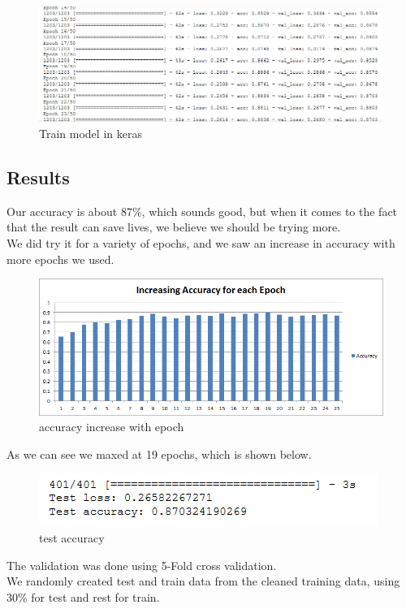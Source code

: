 \documentclass[fleqn,10pt]{SelfArx} %
\begin{document}
\begin{figure}[ht]\centering
\includegraphics[width=\linewidth]{trainmodel}
\caption{Train model in keras}
\label{fig:trainmodel}
\end{figure}




\subsection{Results}
Our accuracy is about 87\%, which sounds good, but when it comes to the fact that the result can save lives, we believe we should be trying more.\\
We did try it for a variety of epochs, and we saw an increase in accuracy with more epochs we used.\\
\begin{figure}[H]\centering
	\includegraphics[width=\linewidth]{increasingaccuracy.png}
	\caption{accuracy increase with epoch}
	\label{fig:accuracy inc}
\end{figure}
As we can see we maxed at 19 epochs, which is shown below.\\
\begin{figure}[H]\centering
\includegraphics[width=\linewidth]{testaccuracy}
\caption{test accuracy}
\label{fig:testaccuracy}
\end{figure}
The validation was done using 5-Fold cross validation.\\
We randomly created test and train data from the cleaned training data, using 30\% for test and rest for train.
\end{document}
